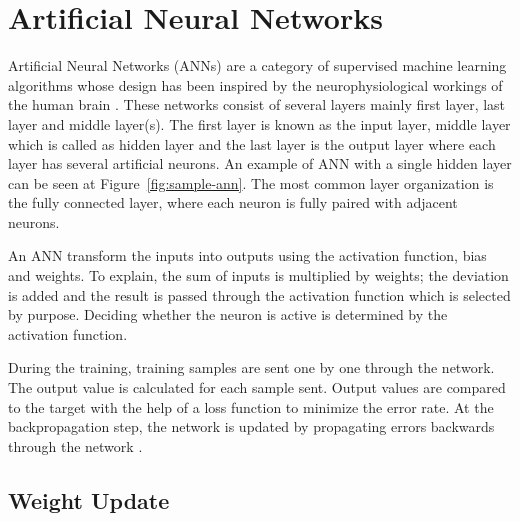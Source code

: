 
\section{Artificial Neural Networks}

    Artificial Neural Networks (ANNs) are a category of supervised machine learning algorithms whose design has been inspired by the neurophysiological workings of the human brain \cite{hill1994artificial}.
    These networks consist of several layers mainly first layer, last layer and middle layer(s).
    The first layer is known as the input layer, middle layer which is called as hidden layer and the last layer is the output layer where each layer has several artificial neurons.
    An example of ANN with a single hidden layer can be seen at Figure~\ref{fig:sample-ann}.
    The most common layer organization is the fully connected layer, where each neuron is fully paired with adjacent neurons.

    An ANN transform the inputs into outputs using the activation function, bias and weights.
    To explain, the sum of inputs is multiplied by weights; the deviation is added and the result is passed through the activation function which is selected by purpose.
    Deciding whether the neuron is active is determined by the activation function.

    

    During the training, training samples are sent one by one through the network.
    The output value is calculated for each sample sent.
    Output values are compared to the target with the help of a loss function to minimize the error rate.
    At the backpropagation step, the network is updated by propagating errors backwards through the network \cite{lecun1988theoretical}.

    \subsection{Weight Update}

